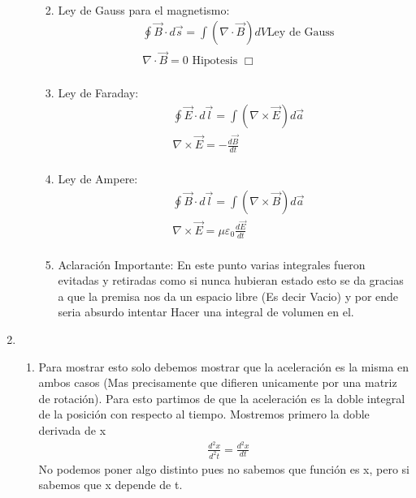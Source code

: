 \documentclass[12pt]{exam}
\begin{document}
\begin{enumerate}
\begin{enumerate}
\begin{enumerate}
\begin{align*}
						\end{align*}
					\item Ley de Gauss para el magnetismo:
						\begin{align*}
							&\oint \Vec{B}\cdot d\Vec{s} = \int (\nabla\cdot\Vec{B})dV\text{Ley  de Gauss}\\
							&\nabla\cdot\Vec{B} = 0 \text{ Hipotesis } \Box\\
						\end{align*}
					\item Ley de Faraday:
						\begin{align*}
							&\oint \Vec{E}\cdot d\Vec{l} = \int (\nabla\times\Vec{E})d\Vec{a}\\
							&\nabla\times\Vec{E} = - \frac{d\Vec{B}}{dt}\\
						\end{align*}
					\item Ley de Ampere:
						\begin{align*}
							&\oint \Vec{B}\cdot d\Vec{l} = \int (\nabla\times\Vec{B})d\Vec{a}\\
							&\nabla\times\Vec{E} = \mu\varepsilon_0\frac{d\Vec{E}}{dt}\\
						\end{align*}
					\item Aclaración Importante:
						En este punto varias integrales fueron evitadas y retiradas como si nunca hubieran estado esto se da gracias a que la premisa nos da un espacio libre (Es decir Vacio) y por ende seria absurdo intentar Hacer una integral de volumen en el.
				\end{enumerate}
	\end{enumerate}
\item \begin{enumerate}
		\item Para mostrar esto solo debemos mostrar que la aceleración es la misma en ambos casos (Mas precisamente que difieren
			unicamente por una matriz de rotación). Para esto partimos de que la aceleración es la doble integral de la posición con
			respecto al tiempo. Mostremos primero la doble derivada de x
			\begin{align*}
				& \frac{d^2x}{d^2t} = \frac{d^2 x}{dt}
			\end{align*}
			No podemos poner algo distinto pues no sabemos que función es x, pero si sabemos que x depende de t.


\end{enumerate}
\end{enumerate}
\end{document}
